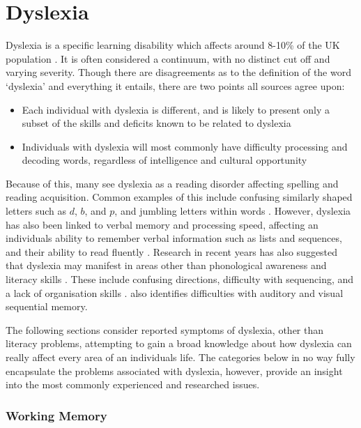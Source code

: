\documentclass[journal]{IEEEtran}
\begin{document}
\section{Dyslexia}
\label{sec:dyslexia}

Dyslexia is a specific learning disability which affects around 8-10\% of the UK population \cite{Nhs,bda}. It is often considered a continuum, with no distinct cut off and varying severity. Though there are disagreements as to the definition of the word `dyslexia' and everything it entails, there are two points all sources agree upon:
 
\begin{itemize}
\item Each individual with dyslexia is different, and is likely to present only a
	subset of the skills and deficits known to be related to dyslexia 
\item Individuals with dyslexia will most commonly have difficulty processing
	and decoding words, regardless of intelligence and cultural opportunity
\end{itemize}

Because of this, many see dyslexia as a reading disorder affecting spelling and reading acquisition. Common examples of this include confusing similarly shaped letters such as $d$, $b$, and $p$, and jumbling letters within words \cite{DetectAndManage}. However, dyslexia has also been linked to verbal memory and processing speed, affecting an individuals ability to remember verbal information such as lists and sequences, and their ability to read fluently \cite{Nhs, RoseReview}. Research in recent years has also suggested that dyslexia may manifest in areas other than phonological awareness and literacy skills \cite{snowling, DetectAndManage}.  These include confusing directions, difficulty with sequencing, and a lack of organisation skills \cite{bda}. \cite{DetectAndManage} also identifies difficulties with auditory and visual sequential memory.

The following sections consider reported symptoms of dyslexia, other than literacy problems, attempting to gain a broad knowledge about how dyslexia can really affect every area of an individuals life. The categories below in no way fully encapsulate the problems associated with dyslexia, however, provide an insight into the most commonly experienced and researched issues.

\subsubsection{Working Memory}
\end{document}
